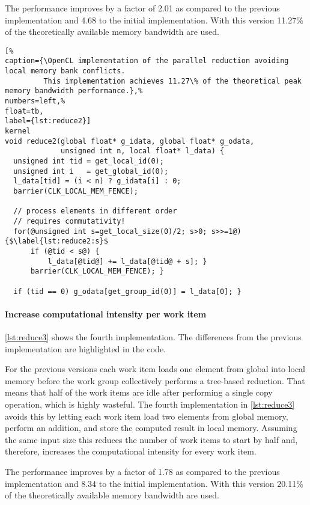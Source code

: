 The performance improves by a factor of 2.01 as compared to the previous implementation and 4.68 to the initial implementation.
With this version 11.27\% of the theoretically available memory bandwidth are used.


\begin{lstlisting}[%                                                             
caption={\OpenCL implementation of the parallel reduction avoiding local memory bank conflicts.
         This implementation achieves 11.27\% of the theoretical peak memory bandwidth performance.},%
numbers=left,%
float=tb,
label={lst:reduce2}]
kernel
void reduce2(global float* g_idata, global float* g_odata,
             unsigned int n, local float* l_data) {
  unsigned int tid = get_local_id(0);
  unsigned int i   = get_global_id(0);
  l_data[tid] = (i < n) ? g_idata[i] : 0;
  barrier(CLK_LOCAL_MEM_FENCE);

  // process elements in different order
  // requires commutativity!
  for(@unsigned int s=get_local_size(0)/2; s>0; s>>=1@) {$\label{lst:reduce2:s}$
      if (@tid < s@) {
          l_data[@tid@] += l_data[@tid@ + s]; }
      barrier(CLK_LOCAL_MEM_FENCE); }

  if (tid == 0) g_odata[get_group_id(0)] = l_data[0]; }
\end{lstlisting}

\paragraph{Increase computational intensity per work item}

\autoref{lst:reduce3} shows the fourth implementation.
The differences from the previous implementation are highlighted in the code.

For the previous versions each work item loads one element from global into local memory before the work group collectively performs a tree-based reduction.
That means that half of the work items are idle after performing a single copy operation, which is highly wasteful.
The fourth implementation in \autoref{lst:reduce3} avoids this by letting each work item load two elements from global memory, perform an addition, and store the computed result in local memory.
Assuming the same input size this reduces the number of work items to start by half and, therefore, increases the computational intensity for every work item.

The performance improves by a factor of 1.78 as compared to the previous implementation and 8.34 to the initial implementation.
With this version 20.11\% of the theoretically available memory bandwidth are used.


